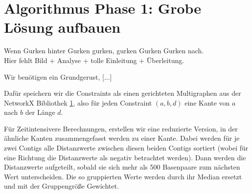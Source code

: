 
\section{Algorithmus Phase 1: Grobe Lösung aufbauen}
Wenn Gurken hinter Gurken gurken, gurken Gurken Gurken nach.\\
Hier fehlt Bild + Analyse + tolle Einleitung + Überleitung.

Wir benötigen ein Grundgerust, [...]

Dafür speichern wir die Constraints als einen gerichteten Multigraphen aus der NetworkX Bibliothek \ref{}, also für jeden Constraint $(a,b,d)$ eine Kante von $a$ nach $b$ der Länge $d$.

Für Zeitintensivere Berechnungen, erstellen wir eine reduzierte Version, in der ähnliche Kanten zusammengefasst werden zu einer Kante. Dabei werden für je zwei Contigs alle Distanzwerte zwischen diesen beiden Contigs sortiert (wobei für eine Richtung die Distanzwerte als negativ betrachtet werden). Dann werden die Distanzwerte aufgeteilt, sobald sie sich mehr als 500 Basenpaare zum nächsten Wert unterscheiden. Die so gruppierten Werte werden durch ihr Median ersetzt und mit der Gruppengröße Gewichtet. 

